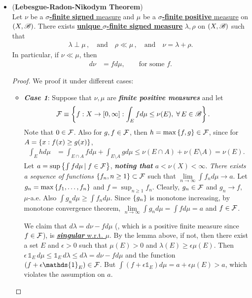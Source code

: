 \documentclass[11pt]{article}
\begin{document}
\begin{itemize}
\item \begin{theorem}(\textbf{Lebesgue-Radon-Nikodym Theorem})\citep{folland2013real}\\
Let $\nu$ be a \underline{\textbf{$\sigma$-finite} \textbf{signed} measure} and $\mu$ be a \underline{\textbf{$\sigma$-finite} \textbf{positive} measure} on $(X,{\mathscr B})$. There exists \underline{\textbf{unique} \textbf{$\sigma$-finite signed measure}} $\lambda, \rho$ on $(X,{\mathscr B})$ such that 
\begin{align*}
\lambda \perp \mu\,, \quad \text{and} \quad \rho \ll \mu\,, \quad \text{and} \quad  \nu= \lambda+ \rho.
\end{align*} 
In particular, if $\nu \ll \mu$, then 
\begin{align*}
d\nu &= f d\mu, \qquad \text{for some }f.
\end{align*} 
\end{theorem}
\begin{proof} We proof it under different cases:
\begin{itemize}
\item \emph{\textbf{Case 1}}: Suppose that $\nu, \mu$ are \emph{\textbf{finite positive measures}} and let 
\begin{align*}
{\mathcal F} &\equiv \left\{f: X\rightarrow [0,\infty]:  \int_{E} f d\mu \le  \nu(E), \; \forall\, E\in {\mathscr B} \right\}.
\end{align*}
Note that $0\in {\mathcal F}$. Also for $g,f \in {\mathcal F}$, then $h = \max\left\{f,g\right\}\in {\mathcal F}$, since for $A= \left\{x: f(x)\ge g(x)\right\}$, 
\begin{align*}
\int_{E} h d\mu &= \int_{E\cap A} fd\mu + \int_{E\setminus A} gd\mu \le \nu(E\cap A)+ \nu(E\setminus A) = \nu(E). 
\end{align*} 
Let $a= \sup\left\{\int f d\mu\,| \; f\in {\mathcal F}\right\}$, \emph{\textbf{noting that} $a< \nu(X)<\infty$}. \emph{There exists a sequence of functions} $\left\{f_{n}, n\ge 1\right\}\subset {\mathcal F}$ such that $\lim\limits_{n\rightarrow \infty}\int f_{n} d\mu \rightarrow a$. Let $g_{n}= \max\left\{f_{1}, \ldots, f_{n}\right\}$ and \underline{$f= \sup_{n\ge 1}f_{n}$}. Clearly, $g_{n}\in {\mathcal F}$ and $g_{n}\rightarrow f,$ $\mu$-a.e. Also $\int g_{n} d\mu \ge \int f_{n} d\mu$. Since $\left\{g_{n}\right\}$ is monotone increasing, by monotone convergence theorem, 
$\lim\limits_{n\rightarrow \infty}\int g_{n} d\mu = \int f d\mu = a$ and $f\in {\mathcal F}$.

We claim that \underline{$d\lambda = d\nu - fd\mu$} (, which is a positive finite measure since $f \in {\mathcal F}$), is \underline{\emph{\textbf{singular}} w.r.t. $\mu$}. By the lemma above, if not, then there exist a set $E$ and $\epsilon>0$ such that $\mu(E)>0$ and $\lambda(E)\ge \epsilon \mu(E)$. Then $\epsilon\,\mathds{1}_{E}\,d\mu \le \mathds{1}_{E}\,d\lambda\le d\lambda = d\nu - fd\mu$ and the function $(f+ \epsilon \mathds{1}_{E}) \in \cF$. 
But $\int (f+ \epsilon \mathds{1}_{E}) d\mu = a+ \epsilon \mu(E)> a$, which violates the assumption on $a$.


\end{itemize}
\end{proof}
\end{itemize}
\end{document}
